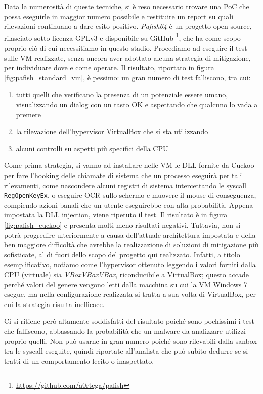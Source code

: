 Data la numerosità di queste tecniche, si è reso necessario trovare una PoC che possa eseguirle in maggior numero possibile e restituire un report su quali rilevazioni continuano a dare esito positivo. \emph{Pafish64} è un progetto open source, rilasciato sotto licenza GPLv3 e disponibile su GitHub
\footnote{\url{https://github.com/a0rtega/pafish}},
che ha come scopo proprio ciò di cui necessitiamo in questo stadio.
Procediamo ad eseguire il test sulle VM realizzate, senza ancora aver adottato alcuna strategia di mitigazione, per individuare dove e come operare. Il risultato, riportato in figura \ref{fig:pafish_standard_vm}, è pessimo: un gran numero di test falliscono, tra cui:
\begin{enumerate}
    \item tutti quelli che verificano la presenza di un potenziale essere umano,
    visualizzando un dialog con un tasto OK e aspettando che qualcuno lo vada a premere
    \item la rilevazione dell'hypervisor VirtualBox che si sta utilizzando
    \item alcuni controlli su aspetti più specifici della CPU
\end{enumerate}

Come prima strategia, si vanno ad installare nelle VM le DLL fornite da Cuckoo per fare l'hooking delle chiamate di sistema che un processo eseguirà per tali rilevamenti, come nascondere alcuni registri di sistema intercettando le syscall \texttt{RegOpenKeyEx}, o eseguire OCR sullo schermo e muovere il mouse di conseguenza, compiendo azioni banali che un utente eseguirebbe con alta probabilità.
Appena impostata la DLL injection, viene ripetuto il test. Il risultato è in figura \ref{fig:pafish_cuckoo} e presenta molti meno risultati negativi.
Tuttavia, non si potrà progredire ulteriormente a causa dell'attuale architettura impostata e della ben maggiore difficoltà che avrebbe la realizzazione di soluzioni di mitigazione più sofisticate, al di fuori dello scopo del progetto qui realizzato.
Infatti, a titolo esemplificativo, notiamo come l'hypervisor ottenuto leggendo i valori forniti dalla CPU (virtuale) sia \emph{VBoxVBoxVBox}, riconducibile a VirtualBox; questo accade perché valori del genere vengono letti dalla macchina su cui la VM Windows 7 esegue, ma nella configurazione realizzata si tratta a sua volta di VirtualBox, per cui la strategia risulta inefficace.

Ci si ritiene però altamente soddisfatti del risultato poiché sono pochissimi i test che falliscono, abbassando la probabilità che un malware da analizzare utilizzi proprio quelli. Non può usarne in gran numero poiché sono rilevabili dalla sanbox tra le syscall eseguite, quindi riportate all'analista che può subito dedurre se si tratti di un comportamento lecito o inaspettato.

